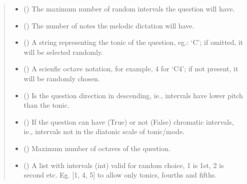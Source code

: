 \documentclass[letterpaper,10pt,english]{sphinxmanual}
\begin{document}
\begin{fulllineitems}
\begin{fulllineitems}
\begin{quote}
\begin{description}
\begin{itemize}
\item {} 
\sphinxAtStartPar
{} () \textendash{} The maximum number of random intervals the
question will have.

\item {} 
\sphinxAtStartPar
{} () \textendash{} The number of notes the melodic dictation will have.

\item {} 
\sphinxAtStartPar
{} () \textendash{} A string representing the tonic of the question,
eg.: ‘C’; if omitted, it will be selected randomly.

\item {} 
\sphinxAtStartPar
{} () \textendash{} A scienfic octave notation, for example, 4 for ‘C4’;
if not present, it will be randomly chosen.

\item {} 
\sphinxAtStartPar
{} () \textendash{} Is the question direction in descending, ie.,
intervals have lower pitch than the tonic.

\item {} 
\sphinxAtStartPar
{} () \textendash{} If the question can have (True) or not (False)
chromatic intervals, ie., intervals not in the diatonic scale
of tonic/mode.

\item {} 
\sphinxAtStartPar
{} () \textendash{} Maximum number of octaves of the question.

\item {} 
\sphinxAtStartPar
{} () \textendash{} A list with intervals (int) valid for
random choice, 1 is 1st, 2 is second etc. Eg. {[}1, 4, 5{]} to
allow only tonics, fourths and fifths.


\end{itemize}
\end{description}
\end{quote}
\end{fulllineitems}
\end{fulllineitems}
\end{document}
